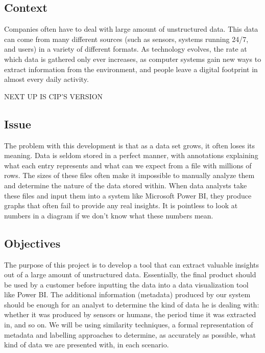 \subsection{Context}
Companies often have to deal with large amount of unstructured data.
This data can come from many different sources (such as sensors, systems running 24/7, and users) in a variety of
different formats.
As technology evolves, the rate at which data is gathered only ever increases, as computer systems gain new ways to
extract information from the environment, and people leave a digital footprint in almost every daily activity.

\vspace{20mm}
NEXT UP IS CIP'S VERSION
\vspace{20mm}

\subsection{Issue}
The problem with this development is that as a data set grows, it often loses its meaning.
Data is seldom stored in a perfect manner, with annotations explaining what each entry represents and what can we
expect from a file with millions of rows.
The sizes of these files often make it impossible to manually analyze them and determine the nature of the data stored within.
When data analysts take these files and input them into a system like Microsoft Power BI, they produce graphs that often fail to
provide any real insights. 
It is pointless to look at numbers in a diagram if we don't know what these numbers mean.

\subsection{Objectives}
The purpose of this project is to develop a tool that can extract valuable insights out of a large amount of unstructured data.
Essentially, the final product should be used by a customer before inputting the data into a data visualization tool like Power BI.
The additional information (metadata) produced by our system should be enough for an analyst to determine the kind of data
he is dealing with: whether it was produced by sensors or humans, the period time it was extracted in, and so on.
We will be using similarity techniques, a formal representation of metadata and labelling approaches to determine, as
accurately as possible, what kind of data we are presented with, in each scenario.

\bigbreak

